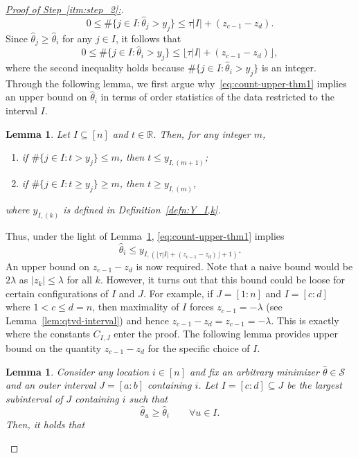 \documentclass[11pt]{article}
\newcommand{\R}{\mathbb{R}}
\newcommand{\cS}{\mathcal{S}}
\theoremstyle{plain}
\newtheorem{lemma}[theorem]{Lemma}
\theoremstyle{definition}
\theoremstyle{remark}
\begin{document}
\begin{proof}[\underline{Proof of Step~\ref{itm:step_2}:}]
\begin{equation*}
0\le \#\{j\in I:\hat\theta_j>y_j\}\le \tau|I|+(z_{c-1}-z_d).
\end{equation*}
Since $\hat{\theta}_j\geq \hat{\theta}_i$ for any $j \in I$, it follows that
\begin{equation}\label{eq:count-upper-thm1}
    0\le \#\{j\in I:\hat\theta_i>y_j\}\le \lfloor \tau|I|+(z_{c-1}-z_d)\rfloor,
\end{equation}
where the second inequality holds because \(\#\{j\in I:\hat\theta_i>y_j\}\) is an integer. Through the following  lemma, we first argue why~\eqref{eq:count-upper-thm1} implies an upper bound on $\hat{\theta}_i$ in terms of order statistics of the data restricted to the interval $I$.
\begin{lemma}\label{lem:orderstat}
Let $I\subseteq[n]$ and $t\in\R$. Then, for any integer $m$,
\begin{enumerate}
\item if $\#\{j\in I: t>y_j\}\le m$, then $t\le y_{I,(m+1)}$;
\item if $\#\{j\in I: t\geq y_j\}\ge m$, then $t\ge y_{I,(m)}$,
\end{enumerate}
where $y_{I,(k)}$ is defined in Definition~\ref{defn:Y_I,k}.
\end{lemma}
Thus, under the light of Lemma~\ref{lem:orderstat}, \eqref{eq:count-upper-thm1} implies
\begin{equation}\label{eq:count-upper-thm1-part2}
    \hat{\theta}_i\leq y_{I,\left(\lfloor \tau|I|+(z_{c-1}-z_d)\rfloor+1\right)}.
\end{equation}
An upper bound on $z_{c-1}-z_d$ is now required. Note that a naive bound would be $2\lambda$ as $|z_k|\leq \lambda$ for all $k$. However, it turns out that this bound could be loose for certain configurations of $I$ and $J$. For example, if $J=[1:n]$ and $I=[c:d]$ where $1<c\leq d=n$, then maximality of $I$ forces $z_{c-1}=-\lambda$ (see Lemma~\ref{lem:qtvd-interval}) and hence $z_{c-1}-z_d=z_{c-1}=-\lambda$. This is exactly where the constants $C_{I,J}$ enter the proof. The following lemma provides upper bound on the quantity $z_{c-1}-z_d$ for the specific choice of $I$. 
\begin{lemma}\label{lemma:z_upper_bd}
    Consider any location $i\in [n]$ and fix an arbitrary minimizer $\hat\theta\in\cS$ and an outer interval $J=[a:b]$ containing $i$. Let $I=[c:d]\subseteq J$ be the largest subinterval of $J$ containing $i$ such that
\[
\hat\theta_u\ge \hat\theta_i\qquad \forall u\in I.
\]
Then, it holds that
\begin{equation}\label{eq:z-upper-key-thm1}

\end{equation}
\end{lemma}
\end{proof}
\end{document}
